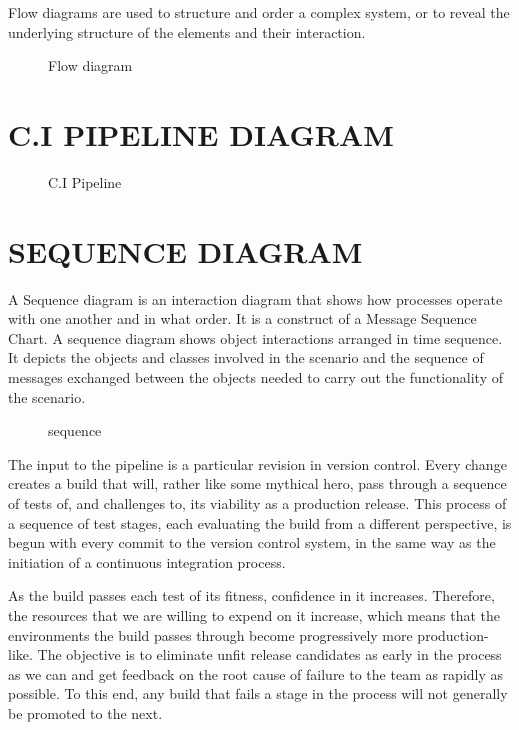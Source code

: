 \documentclass[12pt,a4paper,oneside]{report}
\begin{document}
{Flow diagrams are used to structure and order a complex system, or to reveal the underlying structure of the elements and their interaction.
\begin{figure}[h]
\begin{center}

\hspace{.0 in}
\caption{Flow diagram}
\end{center}

\end{figure}
\pagebreak
\section{C.I PIPELINE DIAGRAM}
\begin{figure}[h]
\begin{center}

\hspace{.0 in}
\caption{C.I Pipeline}
\end{center}

\end{figure}
\pagebreak
\section{SEQUENCE DIAGRAM}
\par A Sequence diagram is an interaction diagram that shows how processes operate with
one another and in what order. It is a construct of a Message Sequence Chart. A sequence
diagram shows object interactions arranged in time sequence. It depicts the objects and classes
involved in the scenario and the sequence of messages exchanged between the objects needed
to carry out the functionality of the scenario.
\begin{figure}[h]
\begin{center}

\hspace{.0 in}
\caption{sequence}
\end{center}

\end{figure}
\par
The input to the pipeline is a particular revision in version control. Every change creates a build that will, rather like some mythical hero, pass through a sequence of tests of, and challenges to, its viability as a production release. This process of a sequence of test stages, each evaluating the build from a different perspective, is begun with every commit to the version control system, in the same way as the initiation of a continuous integration process.
\par
As the build passes each test of its fitness, confidence in it increases. Therefore, the resources that we are willing to expend on it increase, which means that the environments the build passes through become progressively more production-like. The objective is to eliminate unfit release candidates as early in the process as we can and get feedback on the root cause of failure to the team as rapidly as possible. To this end, any build that fails a stage in the process will not generally be promoted to the next.
}
\end{document}
